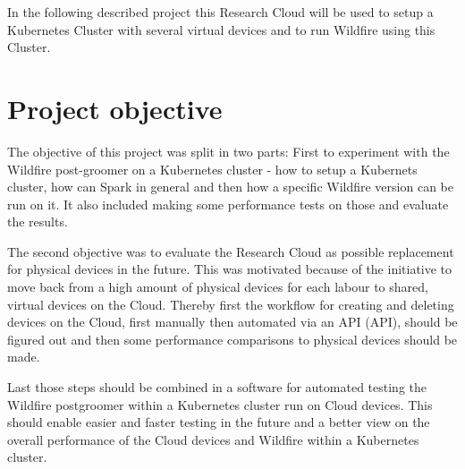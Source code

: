 In the following described project this Research Cloud will be used to setup a Kubernetes Cluster with several virtual devices and to run Wildfire using this Cluster.

\section{Project objective}

The objective of this project was split in two parts: First to experiment with the Wildfire post-groomer on a Kubernetes cluster - how to setup a Kubernets cluster, how can Spark in general and then how a specific Wildfire version can be run on it. It also included making some performance tests on those and evaluate the results. 

The second objective was to evaluate the Research Cloud as possible replacement for physical devices in the future. This was motivated because of the initiative to move back from a high amount of physical devices for each labour to shared, virtual devices on the Cloud. Thereby first the workflow for creating and deleting devices on the Cloud, first manually then automated via an \acs{API} (\acl{API}), should be figured out and then some performance comparisons to physical devices should be made.

Last those steps should be combined in a software for automated testing the Wildfire postgroomer within a Kubernetes cluster run on Cloud devices. This should enable easier and faster testing in the future and a better view on the overall performance of the Cloud devices and Wildfire within a Kubernetes cluster.
